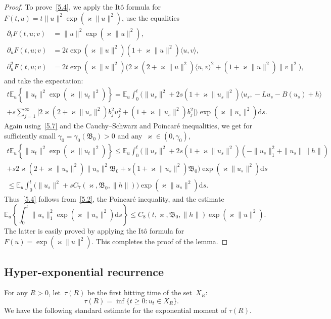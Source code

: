 \documentclass[10pt]{amsart}
\theoremstyle{definition}\newtheorem{defi}[theo]{Definition}\newtheorem{rema}[theo]{Remark}\newtheorem{exam}[theo]{Example}\newtheorem{exem}[theo]{Example}\newtheorem{nota}[theo]{Notation}
\newcommand{\p}{\partial}
\newcommand{\E}{{\mathbb E}}
\newcommand{\vk}{{\varkappa}}
\newcommand{\ty}{\infty}
\newcommand{\BBBB}{{\mathfrak B}}
\newcommand{\lag}{\langle}
\newcommand{\rag}{\rangle}
\newcommand{\dd}{\mathrm{d}}
\begin{document}
\begin{proof}
To prove~\eqref{5.4}, we apply the It\^o formula for $F(t,u)=t\|u\|^2\exp(\varkappa \|u\|^2)$, use the equalities
\begin{align*}
\p_t F(t,u;v)&=\|u\|^2\exp(\varkappa \|u\|^2),\\
\p_u F(t,u;v)&=2t\exp(\varkappa \|u\|^2)(1+ \varkappa\|u\|^2)\lag u,v\rag,\\
\p^2_u F(t,u;v)&=2t\exp(\varkappa \|u\|^2)\big(2\vk (2+ \varkappa\|u\|^2)\lag u,v\rag ^2 + (1+ \varkappa\|u\|^2)\|v\|^2 \big),
\end{align*}
and take the expectation:
\begin{multline*}
t\E_u\left\{\|u_t\|^2 \exp(\varkappa \|u_t\|^2)\right\}= \E_u\!\int_0^t\!\! \Bigg(\|u_s\|^2\!+\!2s(1\!+\! \varkappa\|u_s\|^2)\lag u_s, \!-L u_s\!-\!B(u_s)\!+\!h\rag \\
+s\sum_{j=1}^\ty\Big[2\vk (2+ \varkappa\|u_s\|^2)b_j^2u_j^2 + (1+ \varkappa\|u_s\|^2)b_j^2 \Big]\Bigg) \exp(\varkappa \|u_s\|^2) \dd s.
\end{multline*}
Again using~\eqref{5.7} and the Cauchy--Schwarz and Poincar\'e inequalities, we get for sufficiently small $\gamma_0=\gamma_0(\BBBB_{0})>0$ and any~$\vk\in (0,\gamma_0)$,
\begin{multline*}
t\E_u\left\{\|u_t\|^2\exp(\varkappa \|u_t\|^2)\right\}\le \E_u\int_0^t \big(\|u_s\|^2+ 2s(1+ \varkappa\|u_s\|^2) (-\|u_s\|^2_1+ \|u_s\|\|h\|) \\
+ s 2\vk (2+ \varkappa\|u_s\|^2)\|u_s\|^2\BBBB_{0} + s(1+ \varkappa\|u_s\|^2)\BBBB_{0} \big)\exp(\varkappa \|u_s\|^2) \dd s\\
\le \E_u\int_0^t \Big(\|u_s\|^2 +sC_7(\varkappa, \BBBB_{0}, \|h\|) \Big)\exp(\varkappa \|u_s\|^2) \dd s.
\end{multline*}
Thus~\eqref{5.4} follows from~\eqref{5.2}, the Poincar\'e inequality, and the estimate
\[
\E_u \left\{\int_0^t\|u_s\|_1^2\exp(\varkappa \|u_s\|^2)\dd s\right\} \le C_8(t,\varkappa, \BBBB_{0},\|h\|) \exp(\varkappa \|u\|^2).
\]
The latter is easily proved by applying the It\^o formula for $F(u)=\exp(\varkappa \|u\|^2)$. This completes the proof of the lemma.
\end{proof}

\subsection{Hyper-exponential recurrence}

For any $R>0$, let~$\tau(R)$ be the first hitting time of the set~$X_R$:
\begin{equation}\label{E:tau}
\tau(R)= \inf\{t \ge0:u_{t}\in X_R\}.
\end{equation}
We have the following standard estimate for the exponential moment of $\tau(R)$.
\end{document}
